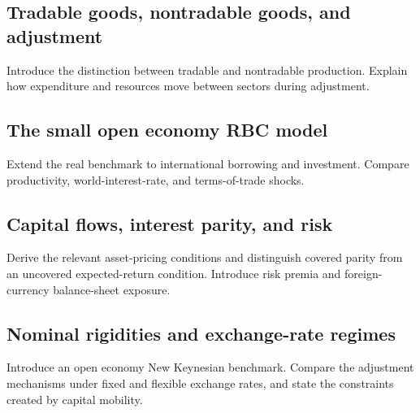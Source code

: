 \subsection{Tradable goods, nontradable goods, and adjustment}
Introduce the distinction between tradable and nontradable production.
Explain how expenditure and resources move between sectors during adjustment.

\clearpage
{}\label{sec:open-fluctuations}

\subsection{The small open economy RBC model}
Extend the real benchmark to international borrowing and investment.
Compare productivity, world-interest-rate, and terms-of-trade shocks.

\subsection{Capital flows, interest parity, and risk}
Derive the relevant asset-pricing conditions and distinguish covered parity
from an uncovered expected-return condition. Introduce risk premia and
foreign-currency balance-sheet exposure.

\subsection{Nominal rigidities and exchange-rate regimes}
Introduce an open economy New Keynesian benchmark. Compare the adjustment
mechanisms under fixed and flexible exchange rates, and state the constraints
created by capital mobility.
